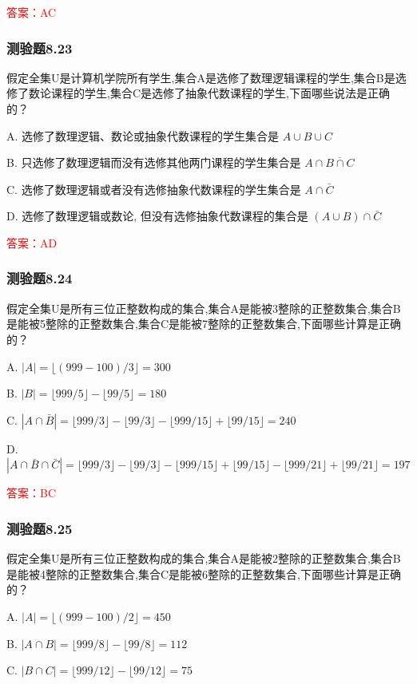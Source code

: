 \documentclass[UTF8, heading=true]{ctexart}
\begin{document}
\textcolor{red}{答案：AC}
\subsubsection{测验题8.23}

假定全集U是计算机学院所有学生,集合A是选修了数理逻辑课程的学生,集合B是选修了数论课程的学生,集合C是选修了抽象代数课程的学生,下面哪些说法是正确的？

A. 选修了数理逻辑、数论或抽象代数课程的学生集合是 $A \cup B \cup C$

B. 只选修了数理逻辑而没有选修其他两门课程的学生集合是 $A \cap \overline{B \cap C}$

C. 选修了数理逻辑或者没有选修抽象代数课程的学生集合是 $A \cap \bar{C}$

D. 选修了数理逻辑或数论, 但没有选修抽象代数课程的集合是 $(A \cup B) \cap \bar{C}$

\textcolor{red}{答案：AD}

\subsubsection{测验题8.24}
假定全集U是所有三位正整数构成的集合,集合A是能被3整除的正整数集合,集合B是能被5整除的正整数集合,集合C是能被7整除的正整数集合,下面哪些计算是正确的？

A. $|A|=\lfloor(999-100) / 3\rfloor=300$

B. $|B|=\lfloor 999 / 5\rfloor-\lfloor 99 / 5\rfloor=180$

C. $|A \cap \bar{B}|=\lfloor 999 / 3\rfloor-\lfloor 99 / 3\rfloor-\lfloor 999 / 15\rfloor+\lfloor 99 / 15\rfloor=240$

D. $|A \cap \bar{B} \cap \bar{C}|=\lfloor 999 / 3\rfloor-\lfloor 99 / 3\rfloor-\lfloor 999 / 15\rfloor+\lfloor 99 / 15\rfloor-\lfloor 999 / 21\rfloor+\lfloor 99 / 21\rfloor=197$

\textcolor{red}{答案：BC}

\subsubsection{测验题8.25}

假定全集U是所有三位正整数构成的集合,集合A是能被2整除的正整数集合,集合B是能被4整除的正整数集合,集合C是能被6整除的正整数集合,下面哪些计算是正确的？

A. $|A|=\lfloor(999-100) / 2\rfloor=450$

B. $|A \cap B|=\lfloor 999 / 8\rfloor-\lfloor 99 / 8\rfloor=112$

C. $|B \cap C|=\lfloor 999 / 12\rfloor-\lfloor 99 / 12\rfloor=75$
\end{document}
